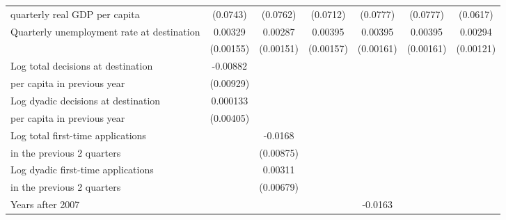 \begin{table}[!ht]
\begin{tabular}{l*{6}{c}}
quarterly real GDP per capita                    &    (0.0743)         &    (0.0762)         &    (0.0712)         &    (0.0777)         &    (0.0777)         &    (0.0617)         \\
[0,5em]
Quarterly unemployment rate at destination&     0.00329\sym{*}  &     0.00287         &     0.00395\sym{*}  &     0.00395\sym{*}  &     0.00395\sym{*}  &     0.00294\sym{*}  \\
                    &   (0.00155)         &   (0.00151)         &   (0.00157)         &   (0.00161)         &   (0.00161)         &   (0.00121)         \\
[0,5em]
Log total decisions at destination&    -0.00882         &                     &                     &                     &                     &                     \\
 per capita in previous year                    &   (0.00929)         &                     &                     &                     &                     &                     \\
[0,5em]
Log dyadic decisions at destination &    0.000133         &                     &                     &                     &                     &                     \\
per capita in previous year                    &   (0.00405)         &                     &                     &                     &                     &                     \\
[0,5em]
Log total first-time applications &                     &     -0.0168         &                     &                     &                     &                     \\
in the previous 2 quarters                    &                     &   (0.00875)         &                     &                     &                     &                     \\
[0,5em]
Log dyadic first-time applications&                     &     0.00311         &                     &                     &                     &                     \\
 in the previous 2 quarters                    &                     &   (0.00679)         &                     &                     &                     &                     \\
[0,5em]
Years after 2007    &                     &                     &                     &     -0.0163         &                     &                     \\

\end{tabular}
\end{table}
